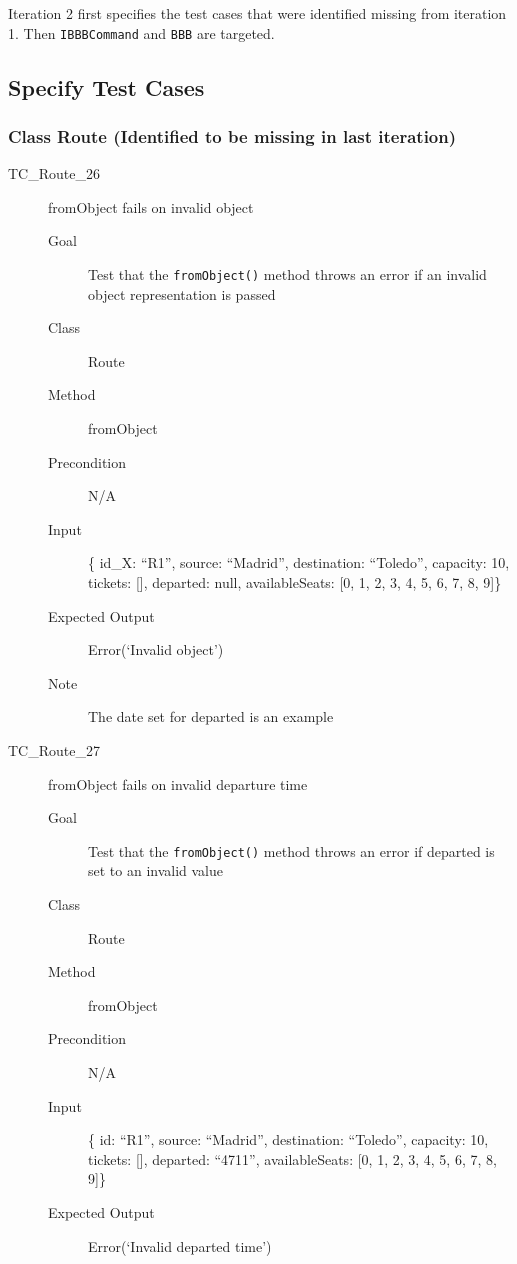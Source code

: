 \documentclass[11pt]{article}
\begin{document}
Iteration 2 first specifies the test cases that were identified missing from iteration 1. Then \texttt{IBBBCommand} and \texttt{BBB} are targeted.

\subsection{Specify Test Cases}
\label{sec:org1b45b49}

\subsubsection{Class Route (Identified to be missing in last iteration)}
\label{sec:org625ba15}

\begin{description}
\item[{TC\_Route\_26}] fromObject fails on invalid object
\begin{description}
\item[{Goal}] Test that the \texttt{fromObject()} method throws an error if an invalid object representation is passed
\item[{Class}] Route
\item[{Method}] fromObject
\item[{Precondition}] N/A
\item[{Input}] \{ id\_X: “R1”, source: “Madrid”, destination: “Toledo”, capacity: 10,  tickets: [], departed: null, availableSeats: [0, 1, 2, 3, 4, 5, 6, 7, 8, 9]\}
\item[{Expected Output}] Error(‘Invalid object’)
\item[{Note}] The date set for departed is an example
\end{description}

\item[{TC\_Route\_27}] fromObject fails on invalid departure time
\begin{description}
\item[{Goal}] Test that the \texttt{fromObject()} method throws an error if departed is set to an invalid value
\item[{Class}] Route
\item[{Method}] fromObject
\item[{Precondition}] N/A
\item[{Input}] \{ id: “R1”, source: “Madrid”, destination: “Toledo”, capacity: 10,  tickets: [], departed: “4711”, availableSeats: [0, 1, 2, 3, 4, 5, 6, 7, 8, 9]\}
\item[{Expected Output}] Error(‘Invalid departed time’)
\end{description}
\end{description}
\end{document}
